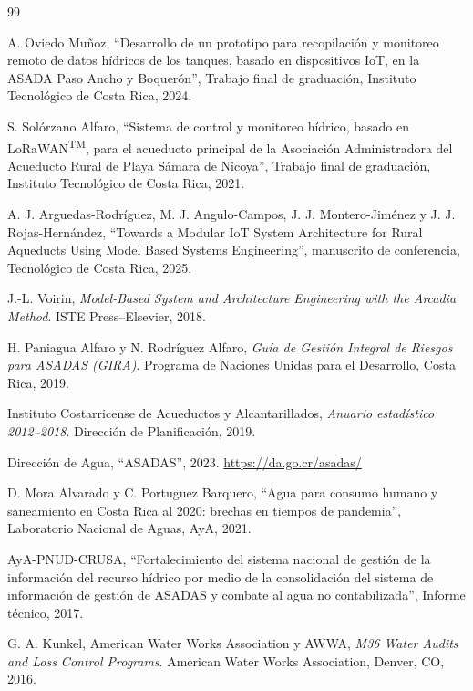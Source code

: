\documentclass[12pt,letterpaper]{article}
\begin{document}
\begin{thebibliography}{99}

A. Oviedo Muñoz, ``Desarrollo de un prototipo para recopilación y monitoreo remoto de datos hídricos de los tanques, basado en dispositivos IoT, en la ASADA Paso Ancho y Boquerón'', Trabajo final de graduación, Instituto Tecnológico de Costa Rica, 2024.

S. Solórzano Alfaro, ``Sistema de control y monitoreo hídrico, basado en LoRaWAN\textsuperscript{TM}, para el acueducto principal de la Asociación Administradora del Acueducto Rural de Playa Sámara de Nicoya'', Trabajo final de graduación, Instituto Tecnológico de Costa Rica, 2021.

A. J. Arguedas-Rodríguez, M. J. Angulo-Campos, J. J. Montero-Jiménez y J. J. Rojas-Hernández, ``Towards a Modular IoT System Architecture for Rural Aqueducts Using Model Based Systems Engineering'', manuscrito de conferencia, Tecnológico de Costa Rica, 2025.

J.-L. Voirin, \emph{Model-Based System and Architecture Engineering with the Arcadia Method}. ISTE Press--Elsevier, 2018.

H. Paniagua Alfaro y N. Rodríguez Alfaro, \emph{Guía de Gestión Integral de Riesgos para ASADAS (GIRA)}. Programa de Naciones Unidas para el Desarrollo, Costa Rica, 2019.

Instituto Costarricense de Acueductos y Alcantarillados, \emph{Anuario estadístico 2012--2018}. Dirección de Planificación, 2019.

Dirección de Agua, ``ASADAS'', 2023. \url{https://da.go.cr/asadas/}

D. Mora Alvarado y C. Portuguez Barquero, ``Agua para consumo humano y saneamiento en Costa Rica al 2020: brechas en tiempos de pandemia'', Laboratorio Nacional de Aguas, AyA, 2021.

AyA-PNUD-CRUSA, ``Fortalecimiento del sistema nacional de gestión de la información del recurso hídrico por medio de la consolidación del sistema de información de gestión de ASADAS y combate al agua no contabilizada'', Informe técnico, 2017.

G. A. Kunkel, American Water Works Association y AWWA, \emph{M36 Water Audits and Loss Control Programs}. American Water Works Association, Denver, CO, 2016.


\end{thebibliography}
\end{document}
